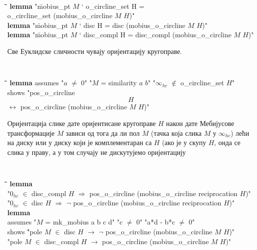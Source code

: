 {\tt
  \begin{tabbing}
    \hspace{5mm}\=\hspace{5mm}\=\hspace{5mm}\=\hspace{5mm}\=\hspace{5mm}\=\kill
{\bf lemma} "\=mobius\_pt $M$ ` o\_circline\_set H = \\
\>o\_circline\_set (mobius\_o\_circline $M$ $H$)"\\
{\bf lemma} "\=mobius\_pt $M$ ` disc H = disc (mobius\_o\_circline $M$ $H$)"\\
{\bf lemma} "\=mobius\_pt $M$ ` disc\_compl H = disc\_compl (mobius\_o\_circline $M$ $H$)"
  \end{tabbing}
}

Све Еуклидске сличности чувају оријентацију кругоправе.  {\tt
  \begin{tabbing}
    \hspace{5mm}\=\hspace{5mm}\=\hspace{5mm}\=\hspace{5mm}\=\hspace{5mm}\=\kill
{\bf lemma}
  assumes "$a$ $\neq$ $0$" "$M$ = similarity $a$ $b$" "$\infty_{hc}$ $\notin$ o\_circline\_set $H$"\\
\>  shows "pos\_o\_circline $$H$$ $\longleftrightarrow$ pos\_o\_circline (mobius\_o\_circline $M$ $H$)"
  \end{tabbing}
}

\noindent Оријентација слике дате оријентисане кругоправе $H$ након
дате Мебијусове трансформације $M$ зависи од тога да ли пол $M$ (тачка
која слика $M$ у $\infty_{hc}$) лећи на диску или у диску који је
комплементаран са $H$ (ако је у скупу $H$, онда се слика у праву, а у
том случају не дискутујемо оријентацију

{\tt
  \begin{tabbing}
  \hspace{3mm}\=\hspace{5mm}\=\hspace{5mm}\=\hspace{5mm}\=\hspace{5mm}\=\kill
{\bf lemma}\\
\>"$0_{hc}$ $\in$ disc\_compl $H$ $\Longrightarrow$ pos\_o\_circline (mobius\_o\_circline reciprocation $H$)"\\
\>"$0_{hc}$ $\in$ disc $H$ $\Longrightarrow$ $\neg$ pos\_o\_circline (mobius\_o\_circline reciprocation $H$)"\\
{\bf lemma}\\
\>assumes "$M$ = mk\_mobius a b c d" "c $\neq$ 0" "a*d - b*c $\neq$ 0"\\
\>shows \="pole $M$ $\in$ disc $H$ $\longrightarrow$ $\neg$ pos\_o\_circline (mobius\_o\_circline $M$ $H$)"\\
\>\>"pole $M$ $\in$ disc\_compl $H$ $\longrightarrow$ pos\_o\_circline (mobius\_o\_circline $M$ $H$)"
  \end{tabbing}
}

